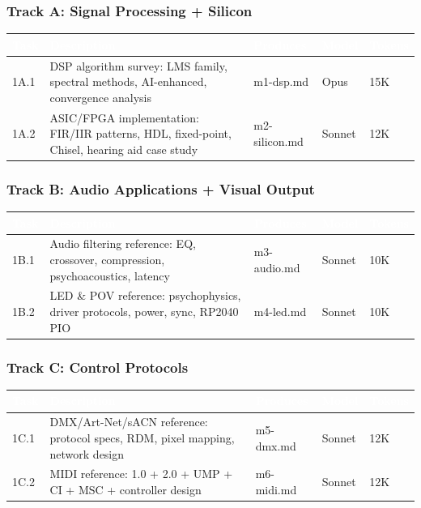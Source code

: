 \documentclass[11pt,letterpaper]{article}
\newcommand{\tableheader}[1]{\textbf{\sffamily\textcolor{white}{#1}}}
\begin{document}
\subsubsection*{Track A: Signal Processing + Silicon}

\begin{center}
\begin{tabularx}{\textwidth}{C{1cm}XL{2.5cm}C{1.2cm}C{1.5cm}}
\toprule
{}
\tableheader{Task} & \tableheader{Description} & \tableheader{Produces} & \tableheader{Model} & \tableheader{Tokens} \\
\midrule
1A.1 & DSP algorithm survey: LMS family, spectral methods, AI-enhanced, convergence analysis & m1-dsp.md & Opus & 15K \\
1A.2 & ASIC/FPGA implementation: FIR/IIR patterns, HDL, fixed-point, Chisel, hearing aid case study & m2-silicon.md & Sonnet & 12K \\
\bottomrule
\end{tabularx}
\end{center}

\subsubsection*{Track B: Audio Applications + Visual Output}

\begin{center}
\begin{tabularx}{\textwidth}{C{1cm}XL{2.5cm}C{1.2cm}C{1.5cm}}
\toprule
{}
\tableheader{Task} & \tableheader{Description} & \tableheader{Produces} & \tableheader{Model} & \tableheader{Tokens} \\
\midrule
1B.1 & Audio filtering reference: EQ, crossover, compression, psychoacoustics, latency & m3-audio.md & Sonnet & 10K \\
1B.2 & LED \& POV reference: psychophysics, driver protocols, power, sync, RP2040 PIO & m4-led.md & Sonnet & 10K \\
\bottomrule
\end{tabularx}
\end{center}

\subsubsection*{Track C: Control Protocols}

\begin{center}
\begin{tabularx}{\textwidth}{C{1cm}XL{2.5cm}C{1.2cm}C{1.5cm}}
\toprule
{}
\tableheader{Task} & \tableheader{Description} & \tableheader{Produces} & \tableheader{Model} & \tableheader{Tokens} \\
\midrule
1C.1 & DMX/Art-Net/sACN reference: protocol specs, RDM, pixel mapping, network design & m5-dmx.md & Sonnet & 12K \\
1C.2 & MIDI reference: 1.0 + 2.0 + UMP + CI + MSC + controller design & m6-midi.md & Sonnet & 12K \\
\bottomrule
\end{tabularx}
\end{center}
\end{document}
